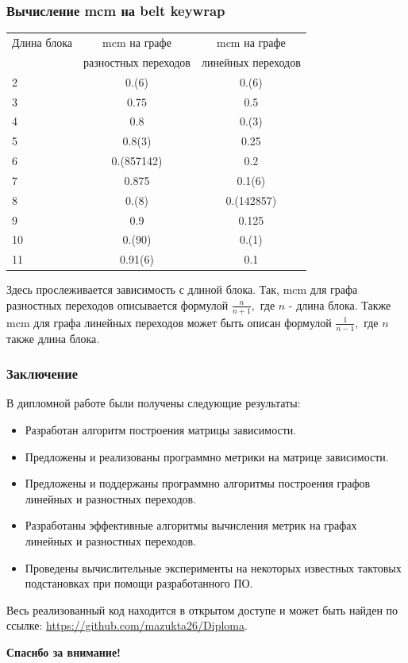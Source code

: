 \documentclass{beamer}
\begin{document}
\begin{frame}
    \frametitle{Вычисление mcm на belt keywrap}

\begin{tabular}{ l | c | c }
  \hline			
  Длина блока & mcm на графе & mcm на графе \\
   & разностных переходов & линейных переходов \\
\hline
  2 & 0.(6) & 0.(6) \\
  3  & 0.75 & 0.5 \\
  4  & 0.8 & 0.(3) \\
  5 & 0.8(3) & 0.25 \\
  6 & 0.(857142) & 0.2 \\
  7 & 0.875 & 0.1(6) \\
  8 & 0.(8) & 0.(142857) \\
  9 & 0.9 & 0.125 \\
  10 & 0.(90) & 0.(1)  \\
  11 & 0.91(6) & 0.1 \\
  \hline  
\end{tabular}
Здесь прослеживается зависимость с длиной блока. Так, mcm для графа разностных переходов описывается формулой $\frac{n}{n+1},$ где $n$ - длина блока. Также mcm для графа линейных переходов может быть описан формулой $\frac{1}{n-1},$ где $n$ также длина блока.

  \end{frame}
\begin{frame}
\frametitle{Заключение}
В дипломной работе были получены следующие результаты:
\begin{itemize}
\item Разработан алгоритм построения матрицы зависимости.
\item Предложены и реализованы программно метрики на матрице зависимости.
\item Предложены и поддержаны программно алгоритмы построения графов линейных и разностных переходов.
\item Разработаны эффективные алгоритмы вычисления метрик на графах линейных и разностных переходов.
\item Проведены вычислительные эксперименты на некоторых известных тактовых подстановках при помощи разработанного ПО.
\end{itemize}

Весь реализованный код находится в открытом доступе и может быть найден по ссылке: \url{https://github.com/mazukta26/Diploma}.
\end{frame}

\begin{frame}
\begin{center} \textbf{Спасибо за внимание!} \end{center}
\end{frame}
\end{document}
